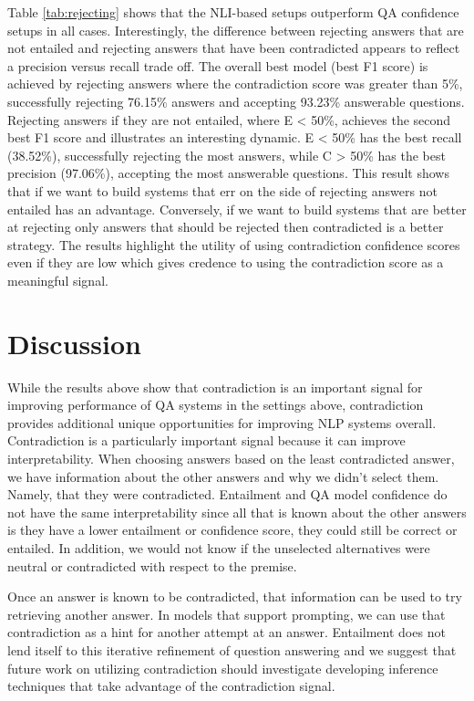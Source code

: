 \documentclass[11pt]{article}
\begin{document}
Table \ref{tab:rejecting} shows that the NLI-based setups outperform QA confidence setups in all cases. Interestingly, the difference between rejecting answers that are not entailed and rejecting answers that have been contradicted appears to reflect a precision versus recall trade off. The overall best model (best F1 score) is achieved by rejecting answers where the contradiction score was greater than 5\%, successfully rejecting 76.15\% answers and accepting 93.23\% answerable questions. Rejecting answers if they are not entailed, where E < 50\%, achieves the second best F1 score and illustrates an interesting dynamic. E < 50\% has the best recall (38.52\%), successfully rejecting the most answers, while C > 50\% has the best precision (97.06\%), accepting the most answerable questions. This result shows that if we want to build systems that err on the side of rejecting answers not entailed has an advantage. Conversely, if we want to build systems that are better at rejecting only answers that should be rejected then contradicted is a better strategy. The results highlight the utility of using contradiction confidence scores even if they are low which gives credence to using the contradiction score as a meaningful signal.
\section{Discussion}
While the results above show that contradiction is an important signal for improving performance of QA systems in the settings above, contradiction provides additional unique opportunities for improving NLP systems overall. Contradiction is a particularly important signal because it can improve interpretability. When choosing answers based on the least contradicted answer, we have information about the other answers and why we didn’t select them. Namely, that they were contradicted. Entailment and QA model confidence do not have the same interpretability since all that is known about the other answers is they have a lower entailment or confidence score, they could still be correct or entailed. In addition, we would not know if the unselected alternatives were neutral or contradicted with respect to the premise.

Once an answer is known to be contradicted, that information can be used to try retrieving another answer. In models that support prompting, we can use that contradiction as a hint for another attempt at an answer. Entailment does not lend itself to this iterative refinement of question answering and we suggest that future work on utilizing contradiction should investigate developing inference techniques that take advantage of the contradiction signal.
\end{document}
